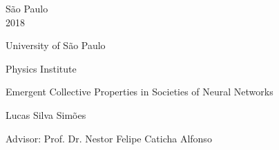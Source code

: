 \begin{center}
	São Paulo \\ 2018
\end{center}

\clearpage


\newpage\null\thispagestyle{empty}\newpage



\pagestyle{empty}

\begin{center}
{\fontsize{16}{16} \selectfont University of São Paulo \\}

\vspace{0.1cm}

{\fontsize{16}{16} \selectfont Physics Institute}

\vspace{2.5cm}

\noindent\hrulefill

{\fontsize{22}{22}\selectfont Emergent Collective Properties in Societies of Neural Networks \par}

\noindent\hrulefill

\vspace{2cm}

{\fontsize{18}{18}\selectfont Lucas Silva Simões \par}

\vspace{2cm}

\end{center}

\leftskip 4cm

\begin{flushright}
\leftskip 5cm
Advisor: Prof. Dr. Nestor Felipe Caticha Alfonso
\end{flushright}

\vspace{0.5cm}

\par
\leftskip 5cm


\par

\leftskip 0cm


